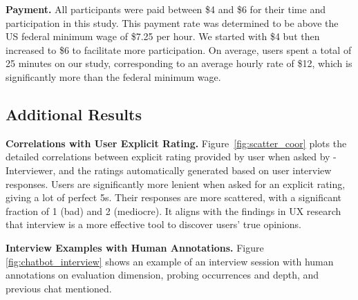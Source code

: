 \textbf{Payment.} All participants were paid between \$4 and \$6 for their time and participation in this study. This payment rate was determined to be above the US federal minimum wage of \$7.25 per hour. We started with \$4 but then increased to \$6 to facilitate more participation. On average, users spent a total of 25 minutes on our study, corresponding to an average hourly rate of \$12, which is significantly more than the federal minimum wage.

\subsection{Additional Results}
\label{app.add_results}

\textbf{Correlations with User Explicit Rating.} Figure~\ref{fig:scatter_coor} plots the detailed correlations between explicit rating provided by user when asked by \method-Interviewer, and the ratings automatically generated based on user interview responses. Users are significantly more lenient when asked for an explicit rating, giving a lot of perfect 5s. Their responses are more scattered, with a significant fraction of 1 (bad) and 2 (mediocre). It aligns with the findings in UX research that interview is a more effective tool to discover users' true opinions.

\textbf{Interview Examples with Human Annotations.} Figure \ref{fig:chatbot_interview} shows an example of an interview session with human annotations on evaluation dimension, probing occurrences and depth, and previous chat mentioned.

